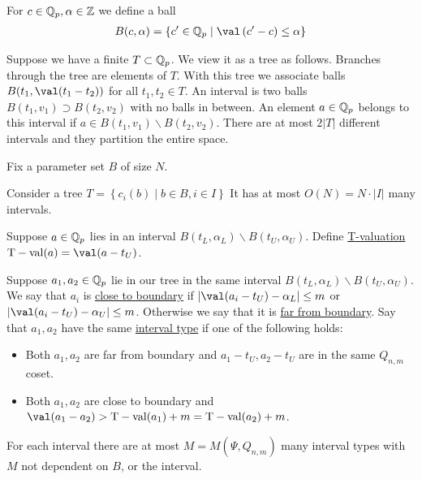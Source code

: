 \documentclass[final]{beamer}
\newcommand{\curly}[1]{\left\{ #1 \right\}}
\newcommand{\paren}[1]{\left( #1 \right)}
\newcommand{\defn}{\underline}
\DeclareMathOperator{\tval}{T-val}
\newlength{\twocolwid}
\begin{document}
\begin{frame}[t]
\begin{columns}[t]
\begin{column}{\twocolwid}
\begin{Definition}
	For $c \in \mathbb{Q}_p, \alpha \in \mathbb{Z}$ we define a ball 
	\begin{align*}
		B(c, \alpha) = \curly{c' \in \Q_p \mid \val \paren{c' - c} \leq \alpha}
	\end{align*}
\end{Definition}

\begin{Definition}
	Suppose we have a finite $T \subset \mathbb{Q}_p$.
	We view it as a tree as follows.
	Branches through the tree are elements of $T$.
	With this tree we associate balls $B(t_1, \val(t_1 - t_2))$ for all $t_1, t_2 \in T$.
	An interval is two balls $B(t_1, v_1) \supset B(t_2, v_2)$ with no balls in between.
	An element $a \in \mathbb{Q}_p$ belongs to this interval if $a \in B(t_1, v_1) \backslash B(t_2, v_2)$.
	There are at most $2|T|$ different intervals and they partition the entire space.
	
	Fix a parameter set $B$ of size $N$.
	
	Consider a tree $T = \curly{c_i(b) \mid b \in B, i \in I}$
	It has at most $O(N) = N \cdot |I|$ many intervals.
\end{Definition}

\begin{Definition}
	Suppose $a \in \mathbb{Q}_p$ lies in an interval $B(t_L, \alpha_L) \backslash B(t_U, \alpha_U)$.
	Define \defn{T-valuation} $\tval(a) = \val(a - t_U)$.    
\end{Definition}
	

\begin{Definition}
    Suppose $a_1, a_2 \in \mathbb{Q}_p$ lie in our tree in the same interval $B(t_L, \alpha_L) \backslash B(t_U, \alpha_U)$.
    We say that $a_i$ is \defn{close to boundary} if $|\val(a_i - t_U) - \alpha_L| \leq m$ or $|\val(a_i - t_U) - \alpha_U| \leq m$.
    Otherwise we say that it is \defn{far from boundary}.
    Say that $a_1, a_2$ have the same \defn{interval type} if one of the following holds:
    \begin{itemize}
        \item Both $a_1, a_2$ are far from boundary and $a_1 - t_U, a_2 - t_U$ are in the same $Q_{n,m}$ coset.
        \item Both $a_1, a_2$ are close to boundary and $\val(a_1 - a_2) > \tval(a_1) + m = \tval(a_2) + m$.
    \end{itemize}      
\end{Definition}

\begin{Lemma}
    For each interval there are at most $M = M(\Psi, Q_{n,m})$ many interval types with $M$ not dependent on $B$, or the interval.
\end{Lemma}  


\end{column}
\end{columns}
\end{frame}
\end{document}
